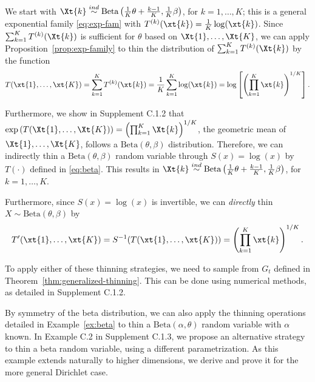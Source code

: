\documentclass[12pt]{article}
\begin{document}
\begin{exmp} \label{ex:beta}
We start with $\Xt{k} \overset{ind}{\sim} \text{Beta}\left(\frac{1}{K}\theta + \frac{k-1}{K}, \frac{1}{K}\beta\right)$, for  $k=1,\dots,K$; this is a 
general exponential family \eqref{eq:exp-fam} with $T^{(k)}(\xt{k}) = \frac1{K}\log(\xt{k})$. Since $ \sum_{k=1}^K T^{(k)}(\Xt{k})$ is sufficient for $\theta$ based on $\Xt{1},\ldots,\Xt{K}$, we can apply Proposition~\ref{prop:exp-family} to thin the distribution of $\sum_{k=1}^K T^{(k)}(\Xt{k})$ by the function
\begin{equation}\label{eq:beta}
T(\xt{1},\dots,\xt{K})=\sum_{k=1}^K T^{(k)}(\xt{k})=\frac1{K}\sum_{k=1}^K\log(\xt{k})=\log\left[\left(\prod_{k=1}^K\xt{k}\right)^{1/K}\right]. 
\end{equation}

Furthermore, we show in Supplement C.1.2 that $\exp\left( T(\Xt{1},\dots,\Xt{K})\right) =\left(\prod_{k=1}^K\Xt{k}\right)^{1/K}$, the geometric mean of $\Xt{1},\ldots,\Xt{K}$,   
follows a $\text{Beta}(\theta, \beta)$ distribution. Therefore, we can indirectly thin a $\text{Beta}(\theta, \beta)$  random variable through  $S(x)=\log(x)$ by $T(\cdot)$ defined in \eqref{eq:beta}. This results in $\Xt{k} \overset{ind}{\sim} \text{Beta}\left(\frac{1}{K}\theta + \frac{k-1}{K}, \frac{1}{K}\beta\right)$, for $k=1,\ldots,K$. 

Furthermore, since $S(x)=\log(x)$ is invertible,  we can \emph{directly} thin $X\sim\text{Beta}(\theta, \beta)$  by 
\begin{equation}
    \label{eq:betaprime}
    T'(\xt{1},\dots,\xt{K})= S^{-1} (T(  \xt{1},\dots,\xt{K})) = \left(\prod_{k=1}^K\xt{k}\right)^{1/K}.
\end{equation}


To apply either of these thinning strategies, we need to sample from  $G_t$ defined in Theorem~\ref{thm:generalized-thinning}. This can be done using numerical methods, as detailed in Supplement C.1.2.  
\end{exmp}  

By symmetry of the beta distribution, we can also apply the thinning operations detailed in Example~\ref{ex:beta} to thin a $\text{Beta}(\alpha, \theta)$ random variable with $\alpha$ known. In Example C.2 in Supplement C.1.3, we propose an alternative strategy to thin a beta random variable, using a different parametrization. As this example extends naturally to higher dimensions, we derive and prove it for the more general Dirichlet case.
\end{document}
